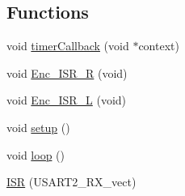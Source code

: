 \subsection*{Functions}
\begin{DoxyCompactItemize}
\item 
void \mbox{\hyperlink{_a_d_a_s___m_c_u_8ino_a9f2f19081d81dba1b47615d1d9363281}{timer\+Callback}} (void $\ast$context)
\item 
void \mbox{\hyperlink{_a_d_a_s___m_c_u_8ino_a13fba9b7b9c02542e403a1142b5ad344}{Enc\+\_\+\+I\+S\+R\+\_\+R}} (void)
\item 
void \mbox{\hyperlink{_a_d_a_s___m_c_u_8ino_a89c135c3ad9390c0a5c08c78a9c985d1}{Enc\+\_\+\+I\+S\+R\+\_\+L}} (void)
\item 
void \mbox{\hyperlink{_a_d_a_s___m_c_u_8ino_a4fc01d736fe50cf5b977f755b675f11d}{setup}} ()
\item 
void \mbox{\hyperlink{_a_d_a_s___m_c_u_8ino_afe461d27b9c48d5921c00d521181f12f}{loop}} ()
\item 
\mbox{\hyperlink{_a_d_a_s___m_c_u_8ino_a63a86aad9ba2e355fe6380da553f554e}{I\+SR}} (U\+S\+A\+R\+T2\+\_\+\+R\+X\+\_\+vect)
\end{DoxyCompactItemize}
